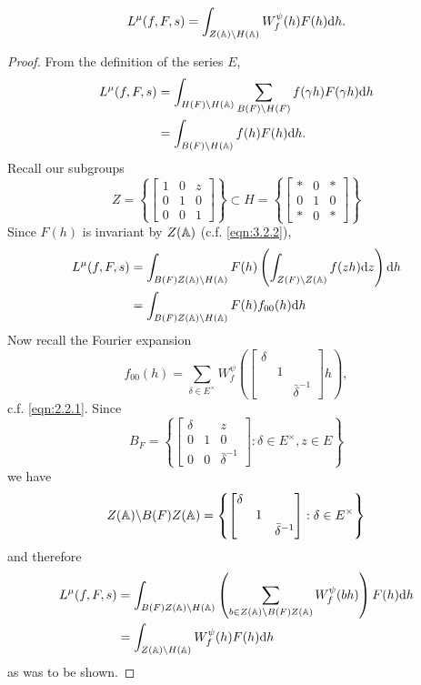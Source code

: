 \subsection{}
\begin{proposition*}
\[
    L^\mu(f, F, s) = \int_{Z(\mathbb{A}) \backslash H(\mathbb{A})} W_f^\psi(h) F(h) \mathrm{d} h.
\]
\end{proposition*}
\begin{proof}
From the definition of the series $E$,
\begin{align*}
    L^\mu(f, F, s) &= \int_{H(F) \backslash H(\mathbb{A})} \sum_{B(F) \backslash H(F)} f(\gamma h) F(\gamma h) \mathrm{d} h \\
    &= \int_{B(F) \backslash H(\mathbb{A})} f(h) F(h) \mathrm{d} h.
\end{align*}
Recall our subgroups
\[
    Z = \left\{
        \begin{bmatrix}
            1 & 0 & z \\ 0 & 1& 0 \\ 0 & 0 & 1
        \end{bmatrix}
    \right\} \subset H = \left\{
        \begin{bmatrix}
            * & 0 & * \\ 0 & 1 & 0 \\ * & 0 & *
        \end{bmatrix}
    \right\}
\]
Since $F(h)$ is invariant by $Z(\mathbb{A})$ (c.f. \eqref{eqn:3.2.2}),
\begin{align*}
    L^\mu(f, F, s) &= \int_{B(F) Z(\mathbb{A}) \backslash H(\mathbb{A})} F(h) \left(\int_{Z(F) \backslash Z(\mathbb{A})} f(zh) \mathrm{d} z\right) \mathrm{d} h \\
    &= \int_{B(F) Z(\mathbb{A}) \backslash H(\mathbb{A})} F(h) f_{00}(h) \mathrm{d} h
\end{align*}
Now recall the Fourier expansion
\[
    f_{00}(h) = \sum_{\delta \in E^\times} W_{f}^{\psi} \left(
        \begin{bmatrix}
            \delta & & \\ & 1 & \\ & & \bar{\delta}^{-1}
        \end{bmatrix}h
    \right),
\]
c.f. \eqref{eqn:2.2.1}. Since
\[
    B_F = \left\{
        \begin{bmatrix}
            \delta & & z \\0 & 1& 0 \\0 & 0 & \bar{\delta}^{-1}
        \end{bmatrix}: \delta \in E^\times, z \in E
    \right\}
\]
we have
\[
    Z(\mathbb{A})\backslash B(F)Z(\mathbb{A}) = \left\{
        \begin{bmatrix}
            \delta & & \\ & 1 & \\ & & \bar{\delta}^{-1}
        \end{bmatrix}: \delta \in E^\times
    \right\}
\]
and therefore
\begin{align*}
    L^\mu(f, F, s) &= \int_{B(F) Z(\mathbb{A}) \backslash H(\mathbb{A})} \left(\sum_{b \in Z(\mathbb{A}) \backslash B(F) Z(\mathbb{A})} W_f^\psi(bh)\right) F(h) \mathrm{d} h \\
    &= \int_{Z(\mathbb{A}) \backslash H(\mathbb{A})} W_f^\psi(h) F(h) \mathrm{d} h
\end{align*}
as was to be shown.
\end{proof}
    

